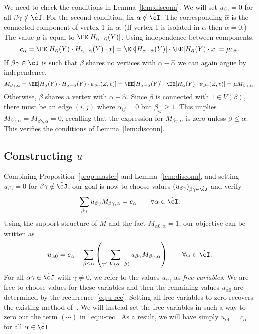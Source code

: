 \documentclass[11pt]{article}
\begin{document}
\noindent We need to check the conditions in Lemma~\ref{lem:disconn}. We will set $u_{\beta\gamma} = 0$ for all $\beta\gamma \notin \hat\cJ$. For the second condition, fix $\alpha \notin \hat\cI$. The corresponding $\hat\alpha$ is the connected component of vertex 1 in $\alpha$. (If vertex 1 is isolated in $\alpha$ then $\hat\alpha = 0$.) The value $\mu$ is equal to $\EE[H_{\alpha - \hat\alpha}(Y)]$. Using independence between components,
\[ c_\alpha = \EE[H_{\hat\alpha}(Y) \cdot H_{\alpha - \hat\alpha}(Y) \cdot x] = \EE[H_{\alpha - \hat\alpha}(Y)] \cdot \EE[H_{\hat\alpha}(Y) \cdot x] = \mu c_{\hat\alpha}. \]
If $\beta\gamma \in \hat\cJ$ is such that $\beta$ shares no vertices with $\alpha-\hat\alpha$ we can again argue by independence,
\[ M_{\beta\gamma,\alpha} = \EE[H_{\hat\alpha}(Y) \cdot H_{\alpha-\hat\alpha}(Y) \cdot \psi_{\beta\gamma}(Z,v)] = \EE[H_{\alpha-\hat\alpha}(Y)] \cdot \EE[H_{\hat\alpha}(Y) \cdot \psi_{\beta\gamma}(Z,v)] = \mu M_{\beta\gamma,\hat\alpha}. \]
Otherwise, $\beta$ shares a vertex with $\alpha-\hat\alpha$. Since $\beta$ is connected with $1 \in V(\beta)$, there must be an edge $(i,j)$ where $\alpha_{ij} = 0$ but $\beta_{ij} \ge 1$. This implies $M_{\beta\gamma,\alpha} = M_{\beta\gamma,\hat\alpha} = 0$, recalling that the expression for $M_{\beta\gamma,\alpha}$ is zero unless $\beta \le \alpha$. This verifies the conditions of Lemma~\ref{lem:disconn}.




\subsection{Constructing $u$}

Combining Proposition~\ref{prop:master} and Lemma~\ref{lem:disconn}, and setting $u_{\beta\gamma} = 0$ for $\beta\gamma \notin \hat\cJ$, our goal is now to choose values $(u_{\beta\gamma})_{\beta\gamma \in \hat\cJ}$ and verify
\[ \sum_{\beta\gamma} u_{\beta\gamma} M_{\beta\gamma,\alpha} = c_\alpha \qquad \forall \alpha \in \hat\cI. \]
Using the support structure of $M$ and the fact $M_{\alpha 0,\alpha} = 1$, our objective can be written as
\begin{equation}\label{eq:u-rec}
u_{\alpha 0} = c_\alpha - \sum_{\beta \lneq \alpha} \left( \sum_{\gamma \subseteq V(\alpha-\beta)} u_{\beta\gamma} M_{\beta\gamma,\alpha}\right) \qquad \forall \alpha \in \hat\cI.
\end{equation}
For all $\alpha\gamma \in \hat\cJ$ with $\gamma \ne 0$, we refer to the values $u_{\alpha\gamma}$ as \emph{free variables}. We are free to choose values for these variables and then the remaining values $u_{\alpha 0}$ are determined by the recurrence~\eqref{eq:u-rec}. Setting all free variables to zero recovers the existing method of~\cite{SW-estimation}. We will instead set the free variables in such a way to zero out the term $\left(\cdots\right)$ in~\eqref{eq:u-rec}. As a result, we will have simply $u_{\alpha 0} = c_\alpha$ for all $\alpha \in \hat\cI$.
\end{document}
